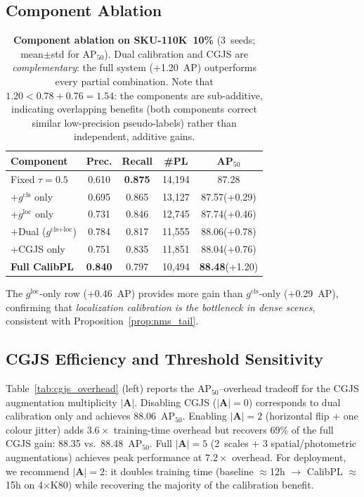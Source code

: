 \documentclass[10pt,twocolumn,letterpaper]{article}
\newcommand{\sku}{\textsc{SKU-110K}\xspace}
\begin{document}
\subsection{Component Ablation}

\begin{table}[t]
  \centering
  \caption{\textbf{Component ablation on \sku\ 10\%} (3~seeds; mean$\pm$std for
  AP$_{50}$). Dual calibration and CGJS are \emph{complementary}: the full
  system (+1.20~AP) outperforms every partial combination. Note that
  $1.20 < 0.78 + 0.76 = 1.54$: the components are sub-additive,
  indicating overlapping benefits (both components correct similar
  low-precision pseudo-labels) rather than independent, additive gains.}
  \vspace{2pt}
  \setlength{\tabcolsep}{2.5pt}
  \begin{tabular}{lcccc}
    \toprule
    \textbf{Component} & Prec. & Recall & \#PL & AP$_{50}$ \\
    \midrule
    Fixed $\tau{=}0.5$         & 0.610 & \textbf{0.875} & 14,194 & 87.28 \\
    +$g^\text{cls}$ only       & 0.695 & 0.865 & 13,127 & 87.57\tiny{(+0.29)} \\
    +$g^\text{loc}$ only       & 0.731 & 0.846 & 12,745 & 87.74\tiny{(+0.46)} \\
    +Dual ($g^\text{cls+loc}$) & 0.784 & 0.817 & 11,555 & 88.06\tiny{(+0.78)} \\
    +CGJS only                 & 0.751 & 0.835 & 11,851 & 88.04\tiny{(+0.76)} \\
    \textbf{Full CalibPL}      & \textbf{0.840} & 0.797 & 10,494 & \textbf{88.48}\tiny{(+1.20)} \\
    \bottomrule
  \end{tabular}
  \label{tab:ablation}
  \vspace{-4pt}
\end{table}

The $g^\text{loc}$-only row (+0.46~AP) provides more gain than
$g^\text{cls}$-only (+0.29~AP), confirming that \emph{localization calibration
is the bottleneck in dense scenes}, consistent with
Proposition~\ref{prop:nms_tail}.

\subsection{CGJS Efficiency and Threshold Sensitivity}

Table~\ref{tab:cgjs_overhead} (left) reports the AP$_{50}$--overhead tradeoff
for the CGJS augmentation multiplicity $|\mathbf{A}|$.
Disabling CGJS ($|\mathbf{A}|{=}0$) corresponds to dual calibration only and
achieves 88.06~AP$_{50}$. Enabling $|\mathbf{A}|{=}2$ (horizontal flip + one
colour jitter) adds $3.6\times$ training-time overhead but recovers 69\% of the
full CGJS gain: 88.35 vs.\ 88.48~AP$_{50}$. Full $|\mathbf{A}|{=}5$ (2~scales
$+$ 3 spatial/photometric augmentations) achieves peak performance at $7.2\times$
overhead. For deployment, we recommend $|\mathbf{A}|{=}2$: it doubles training
time (baseline $\approx$12h $\to$ CalibPL $\approx$15h on 4$\times$K80) while
recovering the majority of the calibration benefit.
\end{document}
